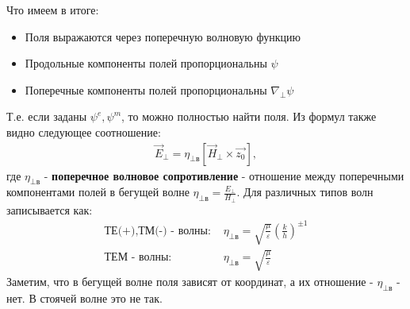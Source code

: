 Что имеем в итоге:
\begin{itemize}
  \item Поля выражаются через поперечную волновую функцию
  \item Продольные компоненты полей пропорциональны $\psi$
  \item Поперечные компоненты полей пропорциональны $\nabla_{\perp} \psi$
\end{itemize}
Т.е. если заданы $\psi^e,\psi^m$, то можно полностью найти поля. Из формул также видно следующее соотношение:
\begin{align*}
  \vec{E}_{\perp} = \eta_{\perp \text{в}}[\vec{H}_{\perp}\times \vec{z_0}] ,
\end{align*}
где $\eta_{\perp \text{в}}$  - \textbf{поперечное волновое сопротивление} - отношение между поперечными компонентами полей в
бегущей волне $\eta_{\perp \text{в}} = \frac{E_{\perp}}{H_{\perp}}$.
Для различных типов волн записывается как:
\begin{align*}
  \text{ТЕ(+),ТМ(-) - волны: }&\eta_{\perp \text{в}} = \sqrt{\frac{\mu}{\varepsilon}}\left(\frac{k}{h}\right)^{\pm1}\\
  \text{ТЕМ - волны: }&\eta_{\perp \text{в}} = \sqrt{\frac{\mu}{\varepsilon}}
\end{align*}
Заметим, что в бегущей волне поля зависят от координат, а их отношение - $\eta_{\perp \text{в}}$ - нет. В стоячей волне
это не так.

